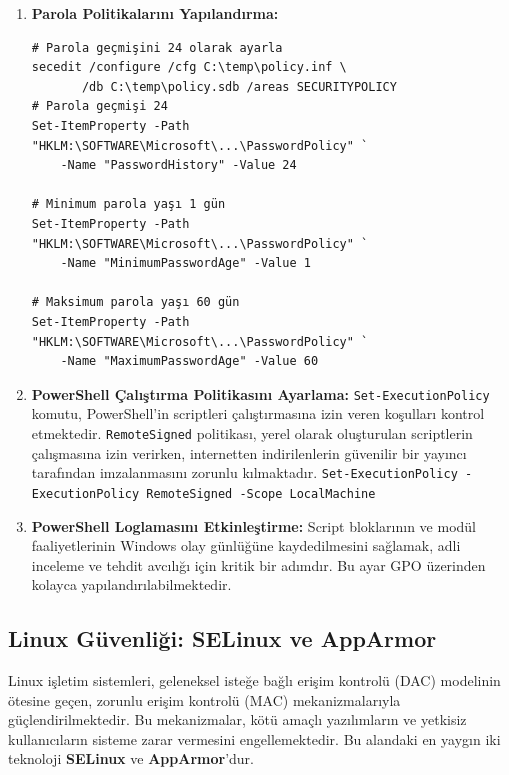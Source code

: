 \begin{enumerate}
    \item \textbf{Parola Politikalarını Yapılandırma:}
    \begin{verbatim}
# Parola geçmişini 24 olarak ayarla
secedit /configure /cfg C:\temp\policy.inf \
       /db C:\temp\policy.sdb /areas SECURITYPOLICY
# Parola geçmişi 24
Set-ItemProperty -Path "HKLM:\SOFTWARE\Microsoft\...\PasswordPolicy" `
    -Name "PasswordHistory" -Value 24

# Minimum parola yaşı 1 gün
Set-ItemProperty -Path "HKLM:\SOFTWARE\Microsoft\...\PasswordPolicy" `
    -Name "MinimumPasswordAge" -Value 1

# Maksimum parola yaşı 60 gün  
Set-ItemProperty -Path "HKLM:\SOFTWARE\Microsoft\...\PasswordPolicy" `
    -Name "MaximumPasswordAge" -Value 60
    \end{verbatim}
    \item \textbf{PowerShell Çalıştırma Politikasını Ayarlama:}
    \texttt{Set-ExecutionPolicy} komutu, PowerShell'in scriptleri çalıştırmasına izin veren koşulları kontrol etmektedir. \texttt{RemoteSigned} politikası, yerel olarak oluşturulan scriptlerin çalışmasına izin verirken, internetten indirilenlerin güvenilir bir yayıncı tarafından imzalanmasını zorunlu kılmaktadır.
    \texttt{Set-ExecutionPolicy -ExecutionPolicy RemoteSigned -Scope LocalMachine}
    \item \textbf{PowerShell Loglamasını Etkinleştirme:}
    Script bloklarının ve modül faaliyetlerinin Windows olay günlüğüne kaydedilmesini sağlamak, adli inceleme ve tehdit avcılığı için kritik bir adımdır. Bu ayar GPO üzerinden kolayca yapılandırılabilmektedir.
\end{enumerate}

\subsection{Linux Güvenliği: SELinux ve AppArmor}

Linux işletim sistemleri, geleneksel isteğe bağlı erişim kontrolü (DAC) modelinin ötesine geçen, zorunlu erişim kontrolü (MAC) mekanizmalarıyla güçlendirilmektedir. Bu mekanizmalar, kötü amaçlı yazılımların ve yetkisiz kullanıcıların sisteme zarar vermesini engellemektedir. Bu alandaki en yaygın iki teknoloji \textbf{SELinux} ve \textbf{AppArmor}'dur.

